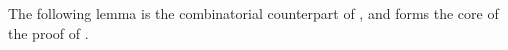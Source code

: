 \documentclass[11pt]{article}
\newcommand{\sz}[1]{\todo[color=pink!40]{sz: #1}}
\newtheorem{lemma}[theorem]{Lemma}
\theoremstyle{remark}
\renewcommand{\le}{\leqslant}
\newcommand{\dist}{\mathrm{dist}}
\begin{document}



The following lemma is
the combinatorial counterpart of ,
and forms
the core of the
proof of .
\end{document}
